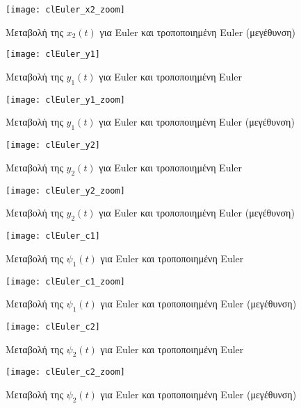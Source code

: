\documentclass{article}
\begin{document}
\begin{figure}[h!]
 \centering
\texttt{[image: clEuler\_x2\_zoom]}
\caption{Μεταβολή της $x_2(t)$ για Euler και τροποποιημένη Euler (μεγέθυνση)}
\end{figure}
\clearpage

\begin{figure}[bh!]
 \centering
\texttt{[image: clEuler\_y1]}
\caption{Μεταβολή της $y_1(t)$ για Euler και τροποποιημένη
 Euler}
\end{figure}

\begin{figure}[h!]
 \centering
\texttt{[image: clEuler\_y1\_zoom]}
\caption{Μεταβολή της $y_1(t)$ για Euler και τροποποιημένη Euler (μεγέθυνση)}
\end{figure}
\clearpage

\begin{figure}[bh!]
 \centering
\texttt{[image: clEuler\_y2]}
\caption{Μεταβολή της $y_2(t)$ για Euler και τροποποιημένη
 Euler}
\end{figure}

\begin{figure}[h!]
 \centering
\texttt{[image: clEuler\_y2\_zoom]}
\caption{Μεταβολή της $y_2(t)$ για Euler και τροποποιημένη Euler (μεγέθυνση)}
\end{figure}
\clearpage

\begin{figure}[bh!]
 \centering
\texttt{[image: clEuler\_c1]}
\caption{Μεταβολή της $\psi_1(t)$ για Euler και τροποποιημένη
 Euler}
\end{figure}

\begin{figure}[h!]
 \centering
\texttt{[image: clEuler\_c1\_zoom]}
\caption{Μεταβολή της $\psi_1(t)$ για Euler και τροποποιημένη Euler (μεγέθυνση)}
\end{figure}
\clearpage

\begin{figure}[bh!]
 \centering
\texttt{[image: clEuler\_c2]}
\caption{Μεταβολή της $\psi_2(t)$ για Euler και τροποποιημένη
 Euler}
\end{figure}

\begin{figure}[h!]
 \centering
\texttt{[image: clEuler\_c2\_zoom]}
\caption{Μεταβολή της $\psi_2(t)$ για Euler και τροποποιημένη Euler (μεγέθυνση)}
\end{figure}
\clearpage
\end{document}
